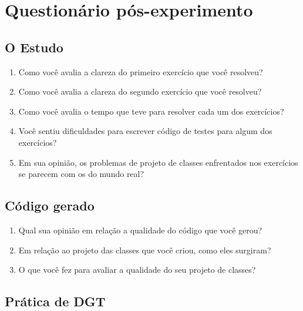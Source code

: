 \chapter{Questionário pós-experimento}
\label{ape:questionario-pos}

\section{O Estudo}

\begin{enumerate}

\item Como você avalia a clareza do primeiro exercício que você resolveu?	

\item Como você avalia a clareza do segundo exercício que você resolveu?	

\item Como você avalia o tempo que teve para resolver cada um dos exercícios?	

\item Você sentiu dificuldades para escrever código de testes para algum dos exercícios?	

\item Em sua opinião, os problemas de projeto de classes enfrentados nos exercícios se parecem com os do mundo real?

\end{enumerate}

\section{Código gerado}

\begin{enumerate}
	
\item Qual sua opinião em relação a qualidade do código que você gerou?	

\item Em relação ao projeto das classes que você criou, como eles surgiram?

\item O que você fez para avaliar a qualidade do seu projeto de classes?	

\end{enumerate}

\section{Prática de DGT}


